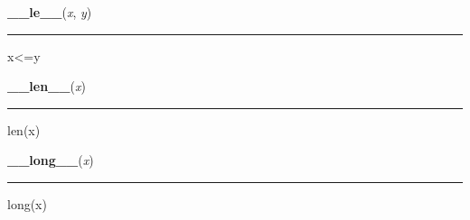     \label{pygame:Color:__le__}

    \vspace{0.5ex}

\hspace{.8\funcindent}\begin{boxedminipage}{\funcwidth}

    \raggedright \textbf{\_\_le\_\_}(\textit{x}, \textit{y})

    \vspace{-1.5ex}

    \rule{\textwidth}{0.5\fboxrule}
\setlength{\parskip}{2ex}
    x{\textless}=y

\setlength{\parskip}{1ex}
    \end{boxedminipage}

    \label{pygame:Color:__len__}

    \vspace{0.5ex}

\hspace{.8\funcindent}\begin{boxedminipage}{\funcwidth}

    \raggedright \textbf{\_\_len\_\_}(\textit{x})

    \vspace{-1.5ex}

    \rule{\textwidth}{0.5\fboxrule}
\setlength{\parskip}{2ex}
    len(x)

\setlength{\parskip}{1ex}
    \end{boxedminipage}

    \label{pygame:Color:__long__}

    \vspace{0.5ex}

\hspace{.8\funcindent}\begin{boxedminipage}{\funcwidth}

    \raggedright \textbf{\_\_long\_\_}(\textit{x})

    \vspace{-1.5ex}

    \rule{\textwidth}{0.5\fboxrule}
\setlength{\parskip}{2ex}
    long(x)

\setlength{\parskip}{1ex}
    \end{boxedminipage}

    \label{pygame:Color:__lt__}

